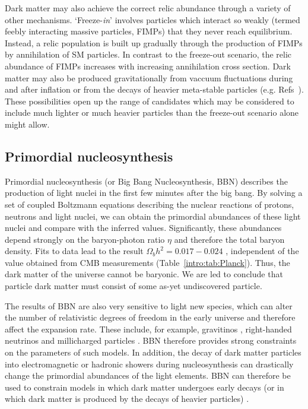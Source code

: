 Dark matter may also achieve the correct relic abundance through a variety of other mechanisms. `Freeze-\textit{in}' \cite{Hall:2009} involves particles which interact so weakly (termed feebly interacting massive particles, FIMPs) that they never reach equilibrium. Instead, a relic population is built up gradually through the production of FIMPs by annihilation of SM particles. In contrast to the freeze-out scenario, the relic abundance of FIMPs increases with increasing annihilation cross section. Dark matter may also be produced gravitationally from vaccuum fluctuations during and after inflation \cite{Chung:1998, Kuzmin:1998} or from the decays of heavier meta-stable particles (e.g. Refs~\cite{Gherghetta:1999, MORE}). These possibilities open up the range of candidates which may be considered to include much lighter or much heavier particles than the freeze-out scenario alone might allow.



\subsection{Primordial nucleosynthesis}


Primordial nucleosynthesis (or Big Bang Nucleosynthesis, BBN) describes the production of light nuclei in the first few minutes after the big bang. By solving a set of coupled Boltzmann equations describing the nuclear reactions of protons, neutrons and light nuclei, we can obtain the primordial abundances of these light nuclei and compare with the inferred values.  Significantly, these abundances depend strongly on the baryon-photon ratio $\eta$ and therefore the total baryon density. Fits to data lead to the result $\Omega_b h^2 = 0.017 - 0.024$ \cite{Fields:2006}, independent of the value obtained from CMB measurements (Table~\ref{intro:tab:Planck}). Thus, the dark matter of the universe cannot be baryonic.  We are led to conclude that particle dark matter must consist of some as-yet undiscovered particle. 

The results of BBN are also very sensitive to light new species, which can alter the number of relativistic degrees of freedom in the early universe and therefore affect the expansion rate. These include, for example, gravitinos \cite{Maggiore:2000}, right-handed neutrinos \cite{Cyburt:2005} and millicharged particles \cite{}. BBN therefore provides strong constraints on the parameters of such models.  In addition, the decay of dark matter particles into electromagnetic or hadronic showers during nucleosynthesis can drastically change the primordial abundances of the light elements. BBN can therefore be used to constrain models in which dark matter undergoes early decays (or in which dark matter is produced by the decays of heavier particles) \cite{Jedamzik:2006}.


